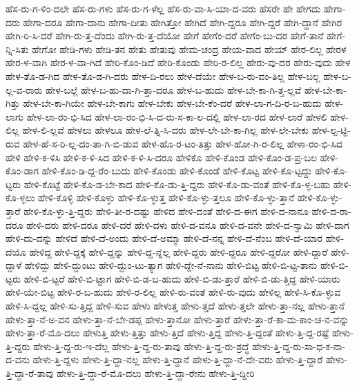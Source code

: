 {ಹೆಸ-ರು-ಗ-ಳಿಂ-ದಲೇ
ಹೆಸ-ರು-ಗಳು
ಹೆಸ-ರು-ಗ-ಳೆಲ್ಲ
ಹೆಸ-ರು-ವಾ-ಸಿ-ಯಾ-ದ-ವರು
ಹೆಸರೇ
ಹೇ
ಹೇಗದು
ಹೇಗಾ-ದರು
ಹೇಗಾ-ದರೂ
ಹೇಗಾ-ದಾನು
ಹೇಗಾ-ದೀತು
ಹೇಗಿತ್ತೋ
ಹೇಗಿದೆ
ಹೇಗಿ-ದ್ದರೂ
ಹೇಗಿ-ದ್ದರೆ
ಹೇಗಿ-ದ್ದಾನೆ
ಹೇಗಿರ
ಹೇಗಿ-ರಿ-ಸಿ-ದರೆ
ಹೇಗಿ-ರು-ತ್ತ-ದೆಂದು
ಹೇಗಿ-ರು-ತ್ತ-ದೆಯೋ
ಹೇಗೆ
ಹೇಗೆಂ-ದರೆ
ಹೇಗೆಂ-ಬು-ದರ
ಹೇಗೆ-ತಾನೆ
ಹೇಗೆ-ನ್ನಿ-ಸಿತು
ಹೇಗೋ
ಹೇಡಿ-ಗಳು
ಹೇಡಿ-ತನ
ಹೇತು
ಹೇತುವು
ಹೇಮ-ಚಂದ್ರ
ಹೇಯ-ವಾದ
ಹೇಯ್
ಹೇರ-ಲಿಲ್ಲ
ಹೇರಳ
ಹೇರ-ಳ-ವಾಗಿ
ಹೇರ-ಳ-ವಾ-ಗಿದೆ
ಹೇರಿ-ಕೊಂ-ಡಿದೆ
ಹೇರಿ-ಕೊಂಡು
ಹೇರಿ-ರ-ಲಿಲ್ಲ
ಹೇರು-ವು-ದರ
ಹೇರು-ವುದು
ಹೇಳ
ಹೇಳ-ತೊ-ಡ-ಗಿದ
ಹೇಳ-ತೊ-ಡ-ಗಿ-ದರು
ಹೇಳ-ದಿ-ರಲು
ಹೇಳ-ದೆಯೇ
ಹೇಳ-ಬ-ರು-ವಂ-ತಿಲ್ಲ
ಹೇಳ-ಬಲ್ಲ
ಹೇಳ-ಬ-ಲ್ಲ-ವ-ರಾರು
ಹೇಳ-ಬಲ್ಲೆ
ಹೇಳ-ಬ-ಹು-ದಾ-ಗಿ-ತ್ತಾ-ದರೂ
ಹೇಳ-ಬ-ಹುದು
ಹೇಳ-ಬೇ-ಕಾ-ಗಿ-ತ್ತ-ಲ್ಲವೆ
ಹೇಳ-ಬೇ-ಕಾ-ಗಿತ್ತು
ಹೇಳ-ಬೇ-ಕಾ-ಗಿಯೇ
ಹೇಳ-ಬೇ-ಕಾಗು
ಹೇಳ-ಬೇಕು
ಹೇಳ-ಬೇ-ಕೆಂ-ದರೆ
ಹೇಳ-ಲಾ-ಗ-ದಿ-ರ-ಬ-ಹುದು
ಹೇಳ-ಲಾಗು
ಹೇಳ-ಲಾ-ರಂ-ಭಿ-ಸಿದ
ಹೇಳ-ಲಾ-ರಂ-ಭಿ-ಸಿ-ದ-ರು-ಸ-ಕಾ-ಲ-ದಲ್ಲಿ
ಹೇಳ-ಲಾ-ರದ
ಹೇಳ-ಲಾರೆ
ಹೇಳಲಿ
ಹೇಳ-ಲಿಲ್ಲ
ಹೇಳ-ಲಿ-ಲ್ಲವೆ
ಹೇಳಲು
ಹೇಳಲೂ
ಹೇಳ-ಲೆ-ತ್ನಿ-ಸಿ-ದರು
ಹೇಳ-ಲೇ-ಬೇ-ಕಾ-ಗಿಲ್ಲ
ಹೇಳ-ಲೇ-ಬೇಕು
ಹೇಳ-ಲ್ಪ-ಟ್ಟಿ-ರುವ
ಹೇಳ-ಹೆ-ಸ-ರಿ-ಲ್ಲ-ದಂ-ತಾ-ಗಿ-ಬಿ-ಡುವ
ಹೇಳ-ಹೊ-ರ-ಟಂ-ತಿತ್ತು
ಹೇಳ-ಹೋ-ಗಿ-ರ-ಲಿಲ್ಲ
ಹೇಳಾ-ರಂ-ಭಿ-ಸಿದ
ಹೇಳಿ
ಹೇಳಿ-ಕ-ಳಿಸಿ
ಹೇಳಿ-ಕ-ಳಿ-ಸಿದ
ಹೇಳಿ-ಕ-ಳಿ-ಸಿ-ದರೂ
ಹೇಳಿಕೊ
ಹೇಳಿ-ಕೊಂಡ
ಹೇಳಿ-ಕೊಂ-ಡ-ಪ್ರ-ಬಲ
ಹೇಳಿ-ಕೊಂ-ಡಾಗ
ಹೇಳಿ-ಕೊಂ-ಡಿ-ದ್ದ-ರೆಂ-ಬುದು
ಹೇಳಿ-ಕೊಂಡು
ಹೇಳಿ-ಕೊಂಡೆ
ಹೇಳಿ-ಕೊಟ್ಟ
ಹೇಳಿ-ಕೊ-ಟ್ಟದ್ದು
ಹೇಳಿ-ಕೊ-ಟ್ಟರು
ಹೇಳಿ-ಕೊಟ್ಟೆ
ಹೇಳಿ-ಕೊ-ಡ-ಬೇ-ಕಾದ
ಹೇಳಿ-ಕೊ-ಡು-ತ್ತಿ-ದ್ದರು
ಹೇಳಿ-ಕೊ-ಡು-ವಂತೆ
ಹೇಳಿ-ಕೊ-ಳ್ಳ-ಬಹು
ಹೇಳಿ-ಕೊ-ಳ್ಳಲು
ಹೇಳಿ-ಕೊಳ್ಳಿ
ಹೇಳಿ-ಕೊಳ್ಳು
ಹೇಳಿ-ಕೊ-ಳ್ಳುತ್ತ
ಹೇಳಿ-ಕೊ-ಳ್ಳು-ತ್ತಲೂ
ಹೇಳಿ-ಕೊ-ಳ್ಳು-ತ್ತಾನೆ
ಹೇಳಿ-ಕೊ-ಳ್ಳು-ತ್ತಾರೆ
ಹೇಳಿ-ಕೊ-ಳ್ಳು-ತ್ತಿ-ದ್ದರು
ಹೇಳಿ-ತೀ-ರ-ದಷ್ಟು
ಹೇಳಿದ
ಹೇಳಿ-ದಂತೆ
ಹೇಳಿ-ದ-ಈಗ
ಹೇಳಿ-ದ-ನಾನೂ
ಹೇಳಿ-ದ-ರಾ-ದರೂ
ಹೇಳಿ-ದರು
ಹೇಳಿ-ದರೂ
ಹೇಳಿ-ದರೆ
ಹೇಳಿ-ದಳು
ಹೇಳಿ-ದ-ವನೂ
ಹೇಳಿ-ದ-ವನೇ
ಹೇಳಿ-ದ-ಸ್ವಾಮಿ
ಹೇಳಿ-ದಾಗ
ಹೇಳಿ-ದು-ದನ್ನು
ಹೇಳಿದೆ
ಹೇಳಿ-ದೆ-ಅಂದು
ಹೇಳಿ-ದೆ-ಅಮ್ಮಾ
ಹೇಳಿ-ದೆ-ನನ್ನ
ಹೇಳಿ-ದೆ-ನೆಂಬ
ಹೇಳಿ-ದೆ-ಯಾರ
ಹೇಳಿ-ದೆಯೊ
ಹೇಳಿದ್ದ
ಹೇಳಿ-ದ್ದಕ್ಕೆ
ಹೇಳಿ-ದ್ದನ್ನು
ಹೇಳಿ-ದ್ದ-ನ್ನೆಲ್ಲ
ಹೇಳಿ-ದ್ದರು
ಹೇಳಿ-ದ್ದರೂ
ಹೇಳಿ-ದ್ದರೋ
ಹೇಳಿ-ದ್ದಾರೆ
ಹೇಳಿ-ದ್ದಾಳೆ
ಹೇಳಿದ್ದು
ಹೇಳಿ-ದ್ದುಂಟು
ಹೇಳಿ-ದ್ದುಂ-ಟು-ತ್ಯಾಗ
ಹೇಳಿ-ದ್ದೇ-ನೆ-ನಾನು
ಹೇಳಿ-ಬಿಟ್ಟ
ಹೇಳಿ-ಬಿ-ಟ್ಟ-ತಾನು
ಹೇಳಿ-ಬಿ-ಟ್ಟರು
ಹೇಳಿ-ಬಿ-ಟ್ಟರೆ
ಹೇಳಿ-ಬಿ-ಟ್ಟಾಗ
ಹೇಳಿ-ಬಿ-ಡ-ಬ-ಹುದು
ಹೇಳಿ-ಬಿ-ಡು-ತ್ತಾರೆ
ಹೇಳಿ-ಬಿ-ಡು-ತ್ತಿದ್ದ
ಹೇಳಿ-ಯಾರು
ಹೇಳಿ-ಯೇ-ಬಿಟ್ಟ
ಹೇಳಿ-ರ-ಬ-ಹುದು
ಹೇಳಿ-ರ-ಲಿಲ್ಲ
ಹೇಳಿ-ರು-ವಂತೆ
ಹೇಳಿ-ರು-ವುದು
ಹೇಳಿಲ್ಲ
ಹೇಳಿ-ಸಿ-ಕೊ-ಳ್ಳುವ
ಹೇಳಿ-ಸಿ-ದ್ದಲ್ಲ
ಹೇಳಿ-ಸು-ತ್ತಿದ್ದ
ಹೇಳಿ-ಸುವ
ಹೇಳು
ಹೇಳುತ್ತ
ಹೇಳು-ತ್ತದೆ
ಹೇಳು-ತ್ತಲೇ
ಹೇಳು-ತ್ತಾ-ನಲ್ಲ
ಹೇಳು-ತ್ತಾನೆ
ಹೇಳು-ತ್ತಾ-ನೆ-ಅ-ವನ
ಹೇಳು-ತ್ತಾ-ನೆ-ಬೇ-ಡಪ್ಪ
ಹೇಳು-ತ್ತಾನೋ
ಹೇಳು-ತ್ತಾರೆ
ಹೇಳು-ತ್ತಾ-ರೆ-ಕಾ-ಮ-ಕಾಂ-ಚ-ನ-ವನ್ನು
ಹೇಳು-ತ್ತಾ-ರೆ-ಮೊ-ದಲು
ಹೇಳುತ್ತಿ
ಹೇಳು-ತ್ತಿತ್ತು
ಹೇಳು-ತ್ತಿದೆ
ಹೇಳು-ತ್ತಿದ್ದ
ಹೇಳು-ತ್ತಿ-ದ್ದಂತೆ
ಹೇಳು-ತ್ತಿ-ದ್ದ-ರಷ್ಟೆ
ಹೇಳು-ತ್ತಿ-ದ್ದರು
ಹೇಳು-ತ್ತಿ-ದ್ದ-ರು-ಇ-ದೆಲ್ಲ
ಹೇಳು-ತ್ತಿ-ದ್ದ-ರು-ತಾವು
ಹೇಳು-ತ್ತಿ-ದ್ದ-ರು-ಶ್ರದ್ಧೆ
ಹೇಳು-ತ್ತಿ-ದ್ದ-ರು-ಸಾ-ಧ-ಕ-ನಾ-ದ-ವನು
ಹೇಳು-ತ್ತಿ-ದ್ದಳು
ಹೇಳು-ತ್ತಿ-ದ್ದಾ-ನಲ್ಲ
ಹೇಳು-ತ್ತಿ-ದ್ದಾನೆ
ಹೇಳು-ತ್ತಿ-ದ್ದಾ-ನೆ-ದೇ-ವರು
ಹೇಳು-ತ್ತಿ-ದ್ದಾರೆ
ಹೇಳು-ತ್ತಿ-ದ್ದಾ-ರೆ-ತಾವು
ಹೇಳು-ತ್ತಿ-ದ್ದಾ-ರೆ-ಮೊ-ದಲು
ಹೇಳು-ತ್ತಿ-ದ್ದಾ-ರೇನು
ಹೇಳು-ತ್ತಿ-ದ್ದೀರಿ
}
